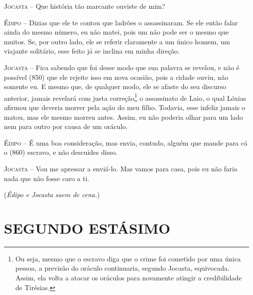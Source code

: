 \textsc{Jocasta} --   Que história tão marcante ouviste de mim?

\textsc{Édipo} --   Dizias que ele te contou que ladrões o assassinaram. Se ele então falar
ainda do mesmo número, eu não matei, pois um não pode ser o mesmo que
muitos. Se, por outro lado, ele se referir claramente a um único homem,
um viajante solitário, esse feito já se inclina em minha direção.

\textsc{Jocasta} --   Fica sabendo que foi desse modo que sua palavra se revelou, e não é
possível (850) que ele rejeite isso em nova ocasião, pois a cidade
ouviu, não somente eu. E mesmo que, de qualquer modo, ele se afaste do
seu discurso anterior, jamais revelará com justa correção\footnote{Ou
  seja, mesmo que o escravo diga que o crime foi cometido por uma única
  pessoa, a previsão do oráculo continuaria, segundo Jocasta,
  equivocada. Assim, ela volta a atacar os oráculos para novamente
  atingir a credibilidade de Tirésias.} o assassinato de Laio, o qual
Lóxias afirmou que deveria morrer pela ação do meu filho. Todavia, esse
infeliz jamais o matou, mas ele mesmo morreu antes. Assim, eu não
poderia olhar para um lado nem para outro por causa de um oráculo.

\textsc{Édipo} --   É uma boa consideração, mas envia, contudo, alguém que mande para cá o
(860) escravo, e não descuides disso.

\textsc{Jocasta} --   Vou me apressar a enviá-lo. Mas vamos para casa, pois eu não faria nada
que não fosse caro a ti.

(\emph{Édipo e Jocasta saem de cena.})

\section{SEGUNDO ESTÁSIMO}

